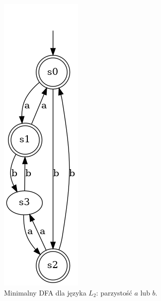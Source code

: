 \begin{figure}[ht]
    \centering
    \includegraphics[width=0.2\linewidth]{images/dfa_even_a_or_even_b.png}
    \caption{Minimalny DFA dla języka \( L_2 \): parzystość \( a \) lub \( b \).}
    \label{fig:dfa_even_a_or_even_b}
\end{figure}

